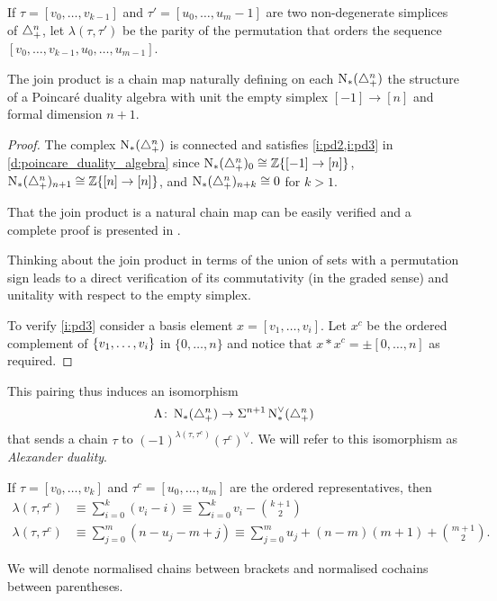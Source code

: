 \begin{notation}
	If $\tau = [v_0,\ldots,v_{k-1}]$ and $\tau'=[u_0,\ldots,u_{m}-1]$ are two non-degenerate simplices of $\triangle_{+}^n$, let $\lambda(\tau,\tau')$ be the parity of the permutation that orders the sequence $[v_0,\ldots,v_{k-1},u_0,\ldots,u_{m-1}]$. 
\end{notation}

\begin{theorem}
	The join product is a chain map naturally defining on each $\operatorname{N}_{*}(\triangle_{+}^{n})$ the structure of a Poincar\'e duality algebra with unit the empty simplex $[-1] \to [n]$ and formal dimension $n+1$.
\end{theorem}


\begin{proof}
	The complex $\operatorname{N}_{*}(\triangle_{+}^{n})$ is connected and satisfies \cref{i:pd2,i:pd3} in \cref{d:poincare_duality_algebra} since $\operatorname{N}_{*}(\triangle_{+}^{n})_0 \cong \mathbb{Z}\{[-1] \to [n]\}$, $\operatorname{N}_{*}(\triangle_{+}^{n})_{n+1} \cong \mathbb{Z}\{[n] \to [n]\}$, and $\operatorname{N}_{*}(\triangle_{+}^{n})_{n+k} \cong 0$ for $k>1$.

	That the join product is a natural chain map can be easily verified and a complete proof is presented in \cite[p.19]{medina2020prop1}.

	Thinking about the join product in terms of the union of sets with a permutation sign leads to a direct verification of its commutativity (in the graded sense) and unitality with respect to the empty simplex.

	To verify \cref{i:pd3} consider a basis element $x = [v_1,\dots,v_i]$.
	Let $x^c$ be the ordered complement of $\{v_1,\dots,v_i\}$ in $\{0,\dots,n\}$ and notice that $x \ast x^c = \pm [0,\dots,n]$ as required.
\end{proof}
This pairing thus induces an isomorphism
\begin{equation}\label{eq:iso1}
	\Lambda\colon \operatorname{N}_{*}(\triangle_{+}^n)\to \Sigma^{n+1}\operatorname{N}^\vee_{*}(\triangle_{+}^n)
\end{equation}
 that sends a chain $\tau$ to $(-1)^{\lambda(\tau,\tau^c)}(\tau^c)^\vee$. We will refer to this isomorphism as \emph{Alexander duality}.

\begin{remark}\label{remark:alex}
 If $\tau = [v_0,\ldots,v_k]$ and $\tau^c  = [u_0,\ldots,u_m]$ are the ordered representatives, then
    \begin{align*}
        \lambda(\tau,\tau^c)&\equiv \sum_{i=0}^k (v_i-i) \equiv \sum_{i=0}^k v_i - \binom{k+1}{2} \\
        \lambda(\tau,\tau^c)&\equiv \sum_{j=0}^m (n-u_j-m+j) \equiv \sum_{j=0}^m u_j +(n-m)(m+1)+\binom{m+1}{2}.
    \end{align*}
\end{remark}

\begin{notation} We will denote normalised chains between brackets and normalised cochains between parentheses.
\end{notation}